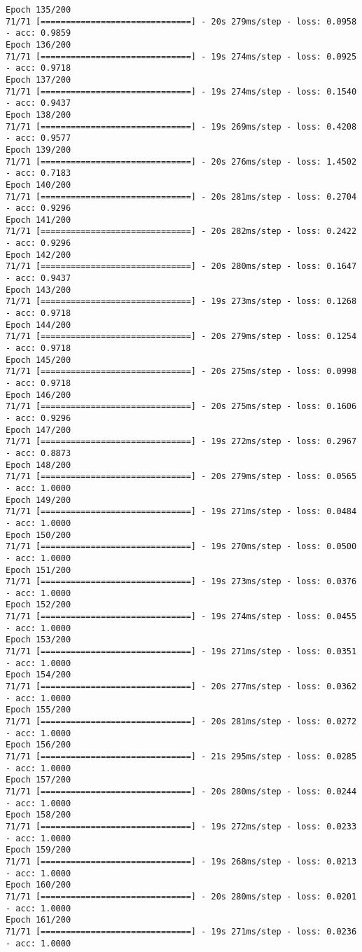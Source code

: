\documentclass[11pt]{article}
\begin{document}
\begin{Verbatim}[commandchars=\\\{\}]
Epoch 135/200
71/71 [==============================] - 20s 279ms/step - loss: 0.0958 - acc: 0.9859
Epoch 136/200
71/71 [==============================] - 19s 274ms/step - loss: 0.0925 - acc: 0.9718
Epoch 137/200
71/71 [==============================] - 19s 274ms/step - loss: 0.1540 - acc: 0.9437
Epoch 138/200
71/71 [==============================] - 19s 269ms/step - loss: 0.4208 - acc: 0.9577
Epoch 139/200
71/71 [==============================] - 20s 276ms/step - loss: 1.4502 - acc: 0.7183
Epoch 140/200
71/71 [==============================] - 20s 281ms/step - loss: 0.2704 - acc: 0.9296
Epoch 141/200
71/71 [==============================] - 20s 282ms/step - loss: 0.2422 - acc: 0.9296
Epoch 142/200
71/71 [==============================] - 20s 280ms/step - loss: 0.1647 - acc: 0.9437
Epoch 143/200
71/71 [==============================] - 19s 273ms/step - loss: 0.1268 - acc: 0.9718
Epoch 144/200
71/71 [==============================] - 20s 279ms/step - loss: 0.1254 - acc: 0.9718
Epoch 145/200
71/71 [==============================] - 20s 275ms/step - loss: 0.0998 - acc: 0.9718
Epoch 146/200
71/71 [==============================] - 20s 275ms/step - loss: 0.1606 - acc: 0.9296
Epoch 147/200
71/71 [==============================] - 19s 272ms/step - loss: 0.2967 - acc: 0.8873
Epoch 148/200
71/71 [==============================] - 20s 279ms/step - loss: 0.0565 - acc: 1.0000
Epoch 149/200
71/71 [==============================] - 19s 271ms/step - loss: 0.0484 - acc: 1.0000
Epoch 150/200
71/71 [==============================] - 19s 270ms/step - loss: 0.0500 - acc: 1.0000
Epoch 151/200
71/71 [==============================] - 19s 273ms/step - loss: 0.0376 - acc: 1.0000
Epoch 152/200
71/71 [==============================] - 19s 274ms/step - loss: 0.0455 - acc: 1.0000
Epoch 153/200
71/71 [==============================] - 19s 271ms/step - loss: 0.0351 - acc: 1.0000
Epoch 154/200
71/71 [==============================] - 20s 277ms/step - loss: 0.0362 - acc: 1.0000
Epoch 155/200
71/71 [==============================] - 20s 281ms/step - loss: 0.0272 - acc: 1.0000
Epoch 156/200
71/71 [==============================] - 21s 295ms/step - loss: 0.0285 - acc: 1.0000
Epoch 157/200
71/71 [==============================] - 20s 280ms/step - loss: 0.0244 - acc: 1.0000
Epoch 158/200
71/71 [==============================] - 19s 272ms/step - loss: 0.0233 - acc: 1.0000
Epoch 159/200
71/71 [==============================] - 19s 268ms/step - loss: 0.0213 - acc: 1.0000
Epoch 160/200
71/71 [==============================] - 20s 280ms/step - loss: 0.0201 - acc: 1.0000
Epoch 161/200
71/71 [==============================] - 19s 271ms/step - loss: 0.0236 - acc: 1.0000

\end{Verbatim}
\end{document}
